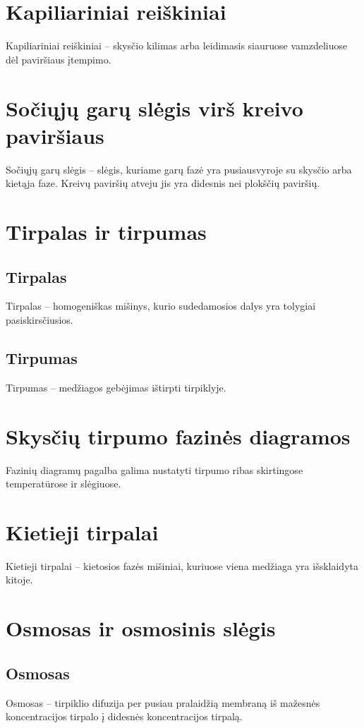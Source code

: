 \documentclass[a4paper,12pt]{article}
\begin{document}
\section{Kapiliariniai reiškiniai}
Kapiliariniai reiškiniai – skysčio kilimas arba leidimasis siauruose vamzdeliuose dėl paviršiaus įtempimo.

\section{Sočiųjų garų slėgis virš kreivo paviršiaus}
Sočiųjų garų slėgis – slėgis, kuriame garų fazė yra pusiausvyroje su skysčio arba kietąja faze. Kreivų paviršių atveju jis yra didesnis nei plokščių paviršių.

\section{Tirpalas ir tirpumas}

\subsection{Tirpalas}
Tirpalas – homogeniškas mišinys, kurio sudedamosios dalys yra tolygiai pasiskirsčiusios.

\subsection{Tirpumas}
Tirpumas – medžiagos gebėjimas ištirpti tirpiklyje.

\section{Skysčių tirpumo fazinės diagramos}
Fazinių diagramų pagalba galima nustatyti tirpumo ribas skirtingose temperatūrose ir slėgiuose.

\section{Kietieji tirpalai}
Kietieji tirpalai – kietosios fazės mišiniai, kuriuose viena medžiaga yra išsklaidyta kitoje.

\section{Osmosas ir osmosinis slėgis}

\subsection{Osmosas}
Osmosas – tirpiklio difuzija per pusiau pralaidžią membraną iš mažesnės koncentracijos tirpalo į didesnės koncentracijos tirpalą.
\end{document}
